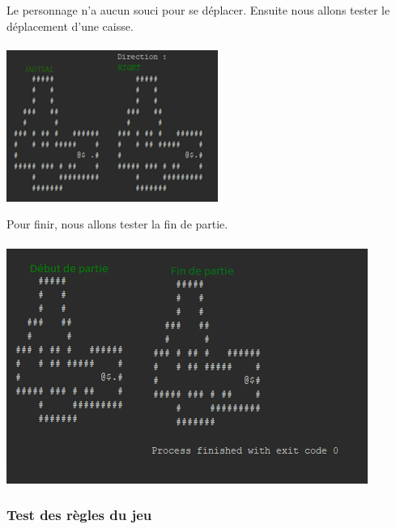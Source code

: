 \documentclass[a4paper,12pt]{article} %
\begin{document}
	Le personnage n'a aucun souci pour se déplacer. Ensuite nous allons tester le déplacement d'une caisse.
	\paragraph{}
	\begin{center}
	\includegraphics[scale=1]{Tests-mouvements-caisse-console.png}
	\end{center}
	
	Pour finir, nous allons tester la fin de partie.
	\paragraph{}
	\begin{center}
	\includegraphics[scale=0.7]{Tests-partie-finie-console.png}
	\end{center}
	
	\subsubsection{Test des règles du jeu}
	
\end{document}
